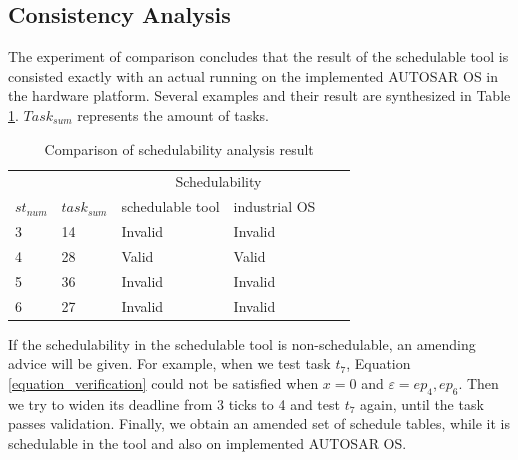 \documentclass[10pt,conference]{IEEEtran}
\begin{document}
{\subsection{Consistency Analysis} 
The experiment of comparison concludes that the result of the schedulable tool is consisted exactly with an actual running on the implemented AUTOSAR OS in the hardware platform. Several examples and their result are synthesized in Table \ref{table_compare}. $Task_{sum}$ represents the amount of tasks. %


\begin{table}[htbp]
  \centering
  \begin{tabular}{llllll}
    \toprule
    &&\multicolumn{2}{c}{Schedulability}\\
    \cmidrule{3-4}
    $st_{num}$ & $task_{sum}$ & schedulable tool & industrial OS\\
    \midrule
    3&14&Invalid&Invalid\\
    4&28&  Valid&    Valid\\
    5&36&Invalid&Invalid\\
    6&27&Invalid&Invalid\\
    
    \bottomrule
  \end{tabular}
  \caption{Comparison of schedulability analysis result}
  \label{table_compare}
\end{table}

If the schedulability in the schedulable tool is non-schedulable, an amending advice will be given. For example, when we test task $t_7$, Equation \ref{equation_verification} could not be satisfied when $x=0$ and $\varepsilon={ep_4,ep_6}$. Then we try to widen its deadline from 3 ticks to 4 and test $t_7$ again, until the task passes validation. 
Finally, we obtain an amended set of schedule tables, while it is schedulable in the tool and also on implemented AUTOSAR OS.


}
\end{document}
